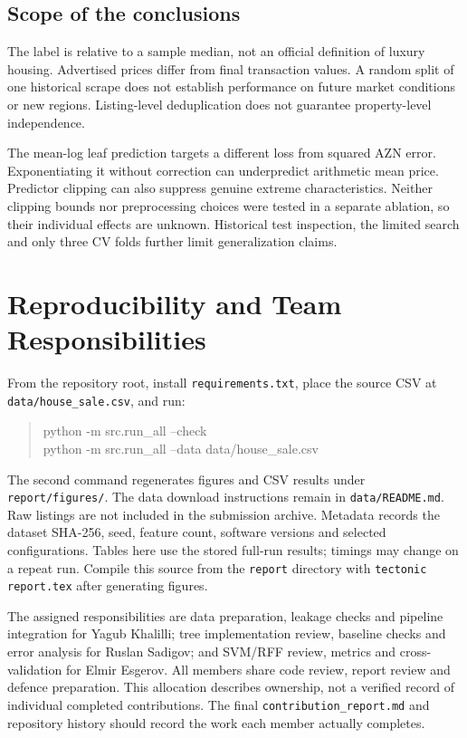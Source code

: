 \documentclass[10pt,twocolumn,a4paper]{article}
\begin{document}
\subsection{Scope of the conclusions}
The label is relative to a sample median, not an official definition of luxury housing. Advertised prices differ from final transaction values. A random split of one historical scrape does not establish performance on future market conditions or new regions. Listing-level deduplication does not guarantee property-level independence.

The mean-log leaf prediction targets a different loss from squared AZN error. Exponentiating it without correction can underpredict arithmetic mean price. Predictor clipping can also suppress genuine extreme characteristics. Neither clipping bounds nor preprocessing choices were tested in a separate ablation, so their individual effects are unknown. Historical test inspection, the limited search and only three CV folds further limit generalization claims.

\section{Reproducibility and Team Responsibilities}
From the repository root, install \texttt{requirements.txt}, place the source CSV at \texttt{data/house\_sale.csv}, and run:
\begin{quote}\footnotesize\ttfamily
python -m src.run\_all --check\\
python -m src.run\_all --data data/house\_sale.csv
\end{quote}
The second command regenerates figures and CSV results under \texttt{report/figures/}. The data download instructions remain in \texttt{data/README.md}. Raw listings are not included in the submission archive. Metadata records the dataset SHA-256, seed, feature count, software versions and selected configurations. Tables here use the stored full-run results; timings may change on a repeat run. Compile this source from the \texttt{report} directory with \texttt{tectonic report.tex} after generating figures.

The assigned responsibilities are data preparation, leakage checks and pipeline integration for Yagub Khalilli; tree implementation review, baseline checks and error analysis for Ruslan Sadigov; and SVM/RFF review, metrics and cross-validation for Elmir Esgerov. All members share code review, report review and defence preparation. This allocation describes ownership, not a verified record of individual completed contributions. The final \texttt{contribution\_report.md} and repository history should record the work each member actually completes.
\end{document}
